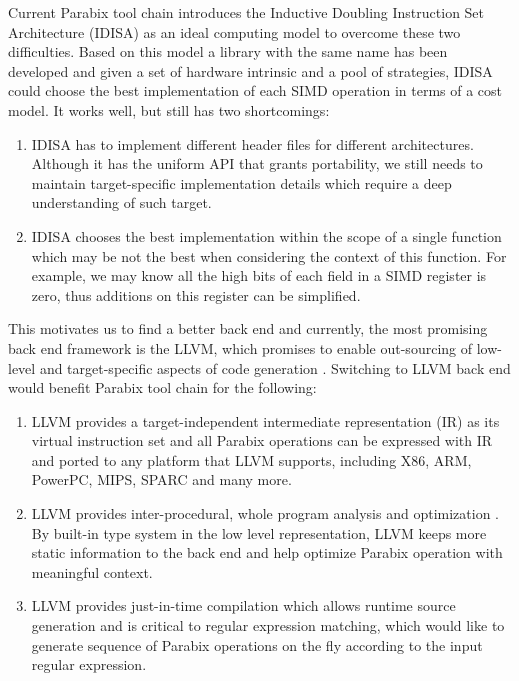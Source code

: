 Current Parabix tool chain introduces the Inductive Doubling Instruction Set Architecture (IDISA) as an ideal computing model to overcome these two difficulties. Based on this model a library with the same name has been developed and given a set of hardware intrinsic and a pool of strategies, IDISA could choose the best implementation of each SIMD operation in terms of a cost model. It works well, but still has two shortcomings:

\begin{enumerate}
  \item IDISA has to implement different header files for different architectures. Although it has the uniform API that grants portability, we still needs to maintain target-specific implementation details which require a deep understanding of such target.
  \item IDISA chooses the best implementation within the scope of a single function which may be not the best when considering the context of this function. For example, we may know all the high bits of each field in a SIMD register is zero, thus additions on this register can be simplified.
\end{enumerate}

This motivates us to find a better back end and currently, the most promising back end framework is the LLVM, which promises to enable out-sourcing of low-level and target-specific aspects of code generation \cite{llvm_ghc, chris_msthesis}. Switching to LLVM back end would benefit Parabix tool chain for the following:

\begin{enumerate}
  \item LLVM provides a target-independent intermediate representation (IR) as its virtual instruction set and all Parabix operations can be expressed with IR and ported to any platform that LLVM supports, including X86, ARM, PowerPC, MIPS, SPARC and many more.
  \item LLVM provides inter-procedural, whole program analysis and optimization \cite{llvm_cgo04}. By built-in type system in the low level representation, LLVM keeps more static information to the back end and help optimize Parabix operation with meaningful context.
  \item LLVM provides just-in-time compilation which allows runtime source generation and is critical to regular expression matching, which would like to generate sequence of Parabix operations on the fly according to the input regular expression.
\end{enumerate}

